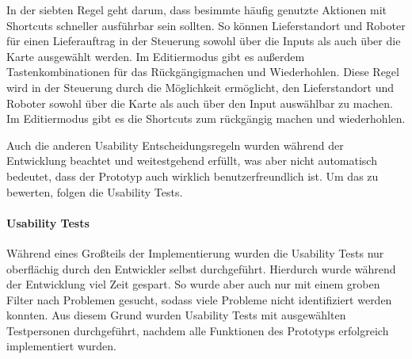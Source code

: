 
In der siebten Regel geht darum, dass besimmte häufig genutzte Aktionen mit Shortcuts schneller ausführbar sein sollten. So können Lieferstandort und Roboter für einen Lieferauftrag in der Steuerung sowohl über die Inputs als auch über die Karte ausgewählt werden. Im Editiermodus gibt es außerdem Tastenkombinationen für das Rückgängigmachen und Wiederhohlen.
Diese Regel wird in der Steuerung durch die Möglichkeit ermöglicht, den Lieferstandort und Roboter sowohl über die Karte als auch über den Input auswählbar zu machen. Im Editiermodus gibt es die Shortcuts zum rückgängig machen und wiederhohlen.




Auch die anderen Usability Entscheidungsregeln wurden während der Entwicklung beachtet und weitestgehend erfüllt, was aber nicht automatisch bedeutet, dass der Prototyp auch wirklich benutzerfreundlich ist. Um das zu bewerten, folgen die Usability Tests.

\paragraph{Usability Tests}\label{sec:UsabilityTests}
Während eines Großteils der Implementierung wurden die Usability Tests nur oberflächig durch den Entwickler selbst durchgeführt. Hierdurch wurde während der Entwicklung viel Zeit gespart. So wurde aber auch nur mit einem groben Filter nach Problemen gesucht, sodass viele Probleme nicht identifiziert werden konnten. Aus diesem Grund wurden Usability Tests mit ausgewählten Testpersonen durchgeführt, nachdem alle Funktionen des Prototyps erfolgreich implementiert wurden.

